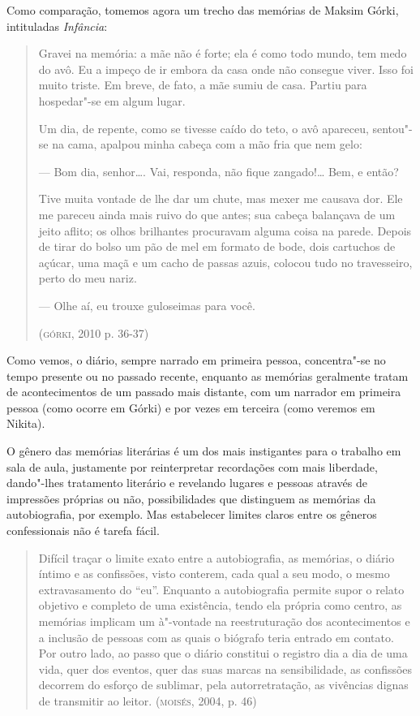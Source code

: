 \documentclass[11pt]{extarticle}
\begin{document}
Como comparação, tomemos agora um trecho das memórias de Maksim Górki,
intituladas \emph{Infância}:

\begin{quote}
Gravei na memória: a mãe não é forte; ela é como todo mundo, tem medo do
avô. Eu a impeço de ir embora da casa onde não consegue viver. Isso foi
muito triste. Em breve, de fato, a mãe sumiu de casa. Partiu para
hospedar"-se em algum lugar.

Um dia, de repente, como se tivesse caído do teto, o avô apareceu,
sentou"-se na cama, apalpou minha cabeça com a mão fria que nem gelo:

--- Bom dia, senhor\ldots{}. Vai, responda, não fique zangado!\ldots{} Bem, e
então?

Tive muita vontade de lhe dar um chute, mas mexer me causava dor. Ele me
pareceu ainda mais ruivo do que antes; sua cabeça balançava de um jeito
aflito; os olhos brilhantes procuravam alguma coisa na parede. Depois de
tirar do bolso um pão de mel em formato de bode, dois cartuchos de
açúcar, uma maçã e um cacho de passas azuis, colocou tudo no
travesseiro, perto do meu nariz.

--- Olhe aí, eu trouxe guloseimas para você.

(\textsc{górki}, 2010 p. 36-37)
\end{quote}


Como vemos, o diário, sempre narrado em primeira pessoa, concentra"-se no
tempo presente ou no passado recente, enquanto as memórias geralmente
tratam de acontecimentos de um passado mais distante, com um narrador em
primeira pessoa (como ocorre em Górki) e por vezes em terceira (como
veremos em Nikita).

O gênero das memórias literárias é um dos mais instigantes para o
trabalho em sala de aula, justamente por reinterpretar recordações com
mais liberdade, dando"-lhes tratamento literário e revelando lugares e
pessoas através de impressões próprias ou não, possibilidades que
distinguem as memórias da autobiografia, por exemplo. Mas estabelecer
limites claros entre os gêneros confessionais não é tarefa fácil.

\begin{quote}
Difícil traçar o limite exato entre a autobiografia, as memórias, o
diário íntimo e as confissões, visto conterem, cada qual a seu modo, o
mesmo extravasamento do ``eu''. Enquanto a autobiografia permite supor o
relato objetivo e completo de uma existência, tendo ela própria como
centro, as memórias implicam um à"-vontade na reestruturação dos
acontecimentos e a inclusão de pessoas com as quais o biógrafo teria
entrado em contato. Por outro lado, ao passo que o diário constitui o
registro dia a dia de uma vida, quer dos eventos, quer das suas marcas
na sensibilidade, as confissões decorrem do esforço de sublimar, pela
autorretratação, as vivências dignas de transmitir ao leitor. (\textsc{moisés},
2004, p. 46)
\end{quote}
\end{document}
